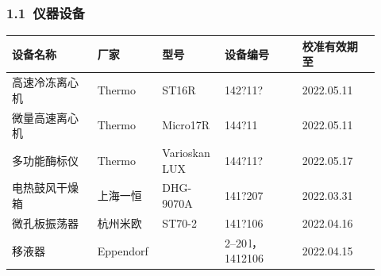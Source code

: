 \documentclass[UTF8,10pt,a4paper,fontset=fandol]{ctexart}
\newcommand{\fieldvalue}[1]{#1}
\newcommand{\handwritten}[1]{#1}
\begin{document}
\subsubsection{1.1\ 仪器设备}

\begin{tabular}{|p{0.22\linewidth}|p{0.14\linewidth}|p{0.16\linewidth}|p{0.20\linewidth}|p{0.20\linewidth}|}
\hline
设备名称 & 厂家 & 型号 & 设备编号 & 校准有效期至 \\
\hline
高速冷冻离心机 & Thermo & ST16R &
\fieldvalue{\handwritten{142?11?}} &
\fieldvalue{\handwritten{2022.05.11}} \\
\hline
微量高速离心机 & Thermo & Micro17R &
\fieldvalue{\handwritten{144?11}} &
\fieldvalue{\handwritten{2022.05.11}} \\
\hline
多功能酶标仪 & Thermo & Varioskan LUX &
\fieldvalue{\handwritten{144?11?}} &
\fieldvalue{\handwritten{2022.05.17}} \\
\hline
电热鼓风干燥箱 & 上海一恒 & DHG-9070A &
\fieldvalue{\handwritten{141?207}} &
\fieldvalue{\handwritten{2022.03.31}} \\
\hline
微孔板振荡器 & 杭州米欧 & ST70-2 &
\fieldvalue{\handwritten{141?106}} &
\fieldvalue{\handwritten{2022.04.16}} \\
\hline
移液器 & Eppendorf & &
\fieldvalue{\handwritten{2--20\,\textmu l，1412106}} &
\fieldvalue{\handwritten{2022.04.15}} \\

\end{tabular}
\end{document}

